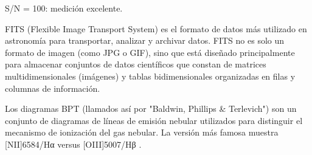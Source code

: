 \documentclass[10pt,twocolumn,a4paper]{opticajnl}
\begin{document}
\begin{description}[style=nextline]
  S/N = 100: medición excelente. \\
  \item[Archivos .fits] FITS (Flexible Image Transport System) es el formato de datos más utilizado en astronomía para transportar, analizar y archivar datos. FITS no es solo un formato de imagen (como JPG o GIF), sino que está diseñado principalmente para almacenar conjuntos de datos científicos que constan de matrices multidimensionales (imágenes) y tablas bidimensionales organizadas en filas y columnas de información.
  \item[Diagramas BPT] Los diagramas BPT (llamados así por "Baldwin, Phillips & Terlevich") son un conjunto de diagramas de líneas de emisión nebular utilizados para distinguir el mecanismo de ionización del gas nebular. La versión más famosa muestra [NII]6584/Hα versus [OIII]5007/Hβ \cite{1981PASP...93....5B}.
\end{description}

\printbibliography
\end{document}
